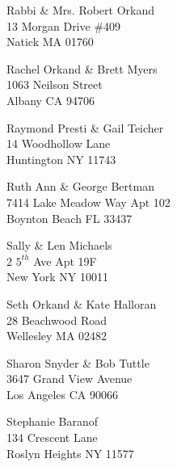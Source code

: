 \documentclass{article}
\begin{document}
\begin{center}
\begin{Huge}
\clearpage

\vspace*{\fill}
Rabbi \& Mrs. Robert Orkand\\
13 Morgan Drive \#409\\
Natick MA 01760\\
\vspace{\fill}

\clearpage

\vspace*{\fill}
Rachel Orkand \& Brett Myers\\
1063 Neilson Street\\
Albany CA 94706\\
\vspace{\fill}

\clearpage

\vspace*{\fill}
Raymond Presti \& Gail Teicher\\
14 Woodhollow Lane\\
Huntington NY 11743\\
\vspace{\fill}

\clearpage

\vspace*{\fill}
Ruth Ann \& George Bertman\\
7414 Lake Meadow Way Apt 102\\
Boynton Beach FL 33437\\
\vspace{\fill}

\clearpage

\vspace*{\fill}
Sally \& Len Michaels\\
2 $5^{th}$ Ave Apt 19F\\
New York NY 10011\\
\vspace{\fill}

\clearpage

\vspace*{\fill}
Seth Orkand \& Kate Halloran\\
28 Beachwood Road\\
Wellesley MA 02482\\
\vspace{\fill}

\clearpage

\vspace*{\fill}
Sharon Snyder \& Bob Tuttle\\
3647 Grand View Avenue\\
Los Angeles CA 90066\\
\vspace{\fill}

\clearpage

\vspace*{\fill}
Stephanie Baranof\\
134 Crescent Lane\\
Roslyn Heights NY 11577\\
\vspace{\fill}

\clearpage

\end{Huge}
\end{center}
			
\end{document}
